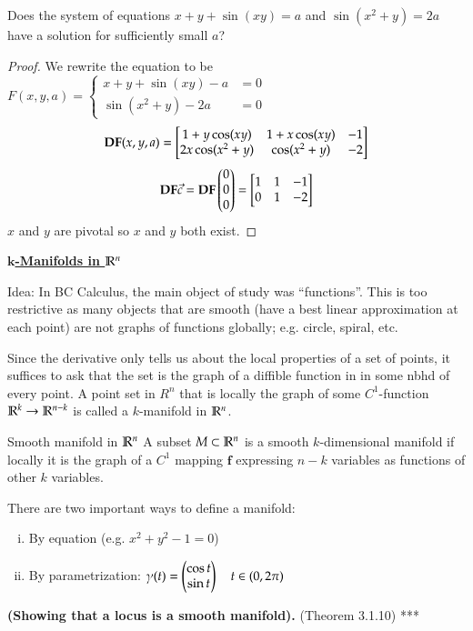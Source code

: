 
Does the system of equations $x+y+\sin (xy)=a$ and $\sin (x^2+y)=2a$ have a solution for sufficiently small $a$?


\begin{proof}
  We rewrite the equation to be $F(x,y,a)=\begin{cases}
    x+y+\sin(xy)-a &= 0 \\
    \sin(x^2+y)-2a &= 0
  \end{cases}$
  \[\textbf{DF}(x,y,a) = \begin{bmatrix} 1 + y\cos(xy) & 1 + x\cos(xy) & -1 \\ 2x\cos(x^2+y) & \cos(x^2+y) & -2 \end{bmatrix}\]
  \[\textbf{DF}\vec{c} = \textbf{DF}\begin{pmatrix} 0 \\ 0 \\ 0 \end{pmatrix} = \begin{bmatrix} 1 & 1 & -1 \\ 0 & 1 & -2 \end{bmatrix}\]
  $x$ and $y$ are pivotal so $x$ and $y$ both exist.
\end{proof}
\vspace{24pt}

\ul{\textbf{$\bm{k}$-Manifolds in $\mathbb{R}^n$}}

Idea: In BC Calculus, the main object of study was ``functions''. This is too restrictive as many objects that are smooth (have a best linear approximation at each point) are not graphs of functions globally; e.g. circle, spiral, etc.

Since the derivative only tells us about the local properties of a set of points, it suffices to ask that the set is the graph of a diffible function in in some nbhd of every point. A point set in $R^n$ that is locally the graph of some $C^1$-function $\mathbb{R}^k\to \mathbb{R}^{n-k}$ is called a $k$-manifold in $\mathbb{R}^n$.

\begin{defn}{Smooth manifold in $\mathbb{R}^n$}
A subset $M\subset \mathbb{R}^n$ is a smooth $k$-dimensional manifold if locally it is the graph of a $C^1$ mapping $\bm{f}$ expressing $n-k$ variables as functions of other $k$ variables.
\end{defn}

There are two important ways to define a manifold:
\begin{enumerate}[(i)]
  \item By equation (e.g. $x^2 + y^2 -1 = 0$)
  \item By parametrization: $\displaystyle \gamma (t)=\begin{pmatrix} \cos t \\ \sin t \end{pmatrix}\quad t\in (0,2\pi)$
\end{enumerate}

\begin{theorem}
  \textbf{(Showing that a locus is a smooth manifold).} (Theorem 3.1.10) ***
\end{theorem}
